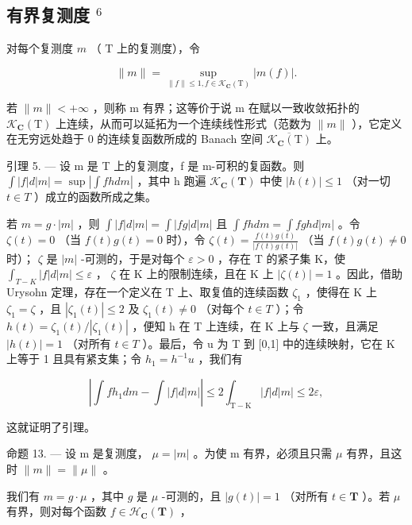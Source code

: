 \subsection{\texorpdfstring{有界复测度 \(^{6}\)}{有界复测度 (note 6)}}

对每个复测度 \(m\) （ \(\mathrm{T}\) 上的复测度），令

\[
\| m \| = \sup _ {\| f \| \leqslant 1,   f \in \mathcal {K} _ {\mathbf {C}} (\mathrm{T})} | m (f) |.
\]

若 \(\|m\| < +\infty\) ，则称 m 有界；这等价于说 m 在赋以一致收敛拓扑的 \(\mathcal{K}_{\mathbf{C}}(\mathrm{T})\) 上连续，从而可以延拓为一个连续线性形式（范数为 \(\|m\|\) ），它定义在无穷远处趋于 0 的连续复函数所成的 Banach 空间 \(\overline{\mathcal{K}_{\mathbf{C}}(\mathrm{T})}\) 上。

引理 5. --- 设 m 是 T 上的复测度，f 是 m-可积的复函数。则 \(\int |f| d|m| = \sup \left| \int f h dm \right|\) ，其中 h 跑遍 \(\mathcal{K}_{\mathbf{C}}(\mathbf{T})\) 中使 \(|h(t)| \leqslant 1\) （对一切 \(t \in T\) ）成立的函数所成之集。

若 \(m = g \cdot |m|\) ，则 \(\int |f| d|m| = \int |fg| d|m|\) 且 \(\int f h dm = \int f gh d|m|\) 。令 \(\zeta(t) = 0\) （当 \(f(t)g(t) = 0\) 时），令 \(\zeta(t) = \frac{f(t)g(t)}{|f(t)g(t)|}\) （当 \(f(t)g(t) \neq 0\) 时）； \(\zeta\) 是 \(|m|\) -可测的，于是对每个 \(\varepsilon > 0\) ，存在 T 的紧子集 K，使 \(\int_{T-K} |f| d|m| \leqslant \varepsilon\) ， \(\zeta\) 在 K 上的限制连续，且在 K 上 \(|\zeta(t)| = 1\) 。因此，借助 Urysohn 定理，存在一个定义在 T 上、取复值的连续函数 \(\zeta_1\) ，使得在 K 上 \(\zeta_1 = \zeta\) ，且 \(|\zeta_1(t)| \leqslant 2\) 及 \(\zeta_1(t) \neq 0\) （对每个 \(t \in T\) ）；令 \(h(t) = \zeta_1(t)/|\zeta_1(t)|\) ，便知 h 在 T 上连续，在 K 上与 \(\zeta\) 一致，且满足 \(|h(t)| = 1\) （对所有 \(t \in T\) ）。最后，令 u 为 T 到 {[}0,1{]} 中的连续映射，它在 K 上等于 1 且具有紧支集；令 \(h_1 = h^{-1}u\) ，我们有

\[
\left| \int f h _ {1} d m - \int | f | d | m | \right| \leqslant 2 \int_ {\mathrm{T-K}} | f | d | m | \leqslant 2 \varepsilon ,
\]

这就证明了引理。

命题 13. --- 设 m 是复测度， \(\mu = |m|\) 。为使 m 有界，必须且只需 \(\mu\) 有界，且这时 \(\|m\| = \|\mu\|\) 。

我们有 \(m = g \cdot \mu\) ，其中 \(g\) 是 \(\mu\) -可测的，且 \(|g(t)| = 1\) （对所有 \(t \in \mathbf{T}\) ）。若 \(\mu\) 有界，则对每个函数 \(f \in \mathcal{H}_{\mathbf{C}}(\mathbf{T})\) ，

